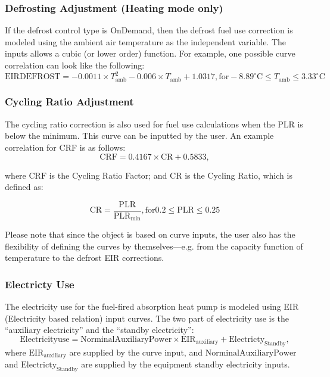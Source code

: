 \subsubsection{Defrosting Adjustment (Heating mode only)}
If the defrost control type is OnDemand, then the defrost fuel use correction is modeled using the ambient air temperature as the independent variable. The inputs allows a cubic (or lower order) function. For example, one possible curve correlation can look like the following:  
\begin{equation}
\mathrm{EIRDEFROST} = -0.0011 \times T_{\mathrm{amb}}^{2} - 0.006 \times T_{\mathrm{amb}} + 1.0317, \mathrm{for} -8.89^{\circ}\mathrm{C} \leq T_{\mathrm{amb}} \leq 3.33^{\circ}\mathrm{C} 
\end{equation}

\subsubsection{Cycling Ratio Adjustment}
The cycling ratio correction is also used for fuel use calculations when the PLR is below the minimum. This curve can be inputted by the user. An example correlation for CRF is as follows: 
\begin{equation}
\mathrm{CRF} = 0.4167 \times \mathrm{CR} + 0.5833,
\end{equation}

where $\mathrm{CRF}$ is the Cycling Ratio Factor; and $\mathrm{CR}$ is the Cycling Ratio, which is defined as: 

\begin{equation}
\mathrm{CR} = \frac{\mathrm{PLR}}{\mathrm{PLR}_{\mathrm{min}}}, \mathrm{for} 0.2 \leq \mathrm{PLR} \leq 0.25
\end{equation}

Please note that since the object is based on curve inputs, the user also has the flexibility of defining the curves by themselves---e.g. from the capacity function of temperature to the defrost EIR corrections. 

\subsubsection{Electricty Use}

The electricity use for the fuel-fired absorption heat pump is modeled using EIR (Electricity based relation) input curves. The two part of electricity use is the ``auxiliary electricity'' and the ``standby electricity'':
\begin{equation}
\mathrm{Electricity use} = \mathrm{Norminal Auxiliary Power} \times \mathrm{EIR}_{\mathrm{auxiliary}} + \mathrm{Electricty}_{\mathrm{Standby}},
\end{equation}
where $\mathrm{EIR}_{\mathrm{auxiliary}}$ are supplied by the curve input, and $\mathrm{Norminal Auxiliary Power}$ and $\mathrm{Electricty}_{\mathrm{Standby}}$ are supplied by the equipment standby electricity inputs. 
